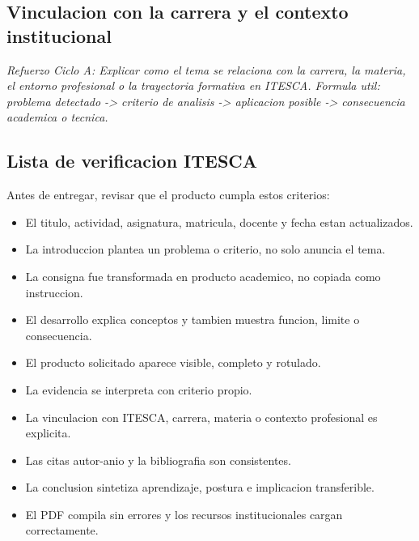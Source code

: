 \documentclass[
	spanish,
	letterpaper, oneside
]{article}
\begin{document}
\subsection{Vinculacion con la carrera y el contexto institucional}

\textit{Refuerzo Ciclo A: Explicar como el tema se relaciona con la carrera, la materia, el entorno profesional o la trayectoria formativa en ITESCA. Formula util: problema detectado -> criterio de analisis -> aplicacion posible -> consecuencia academica o tecnica.}

\subsection{Lista de verificacion ITESCA}

Antes de entregar, revisar que el producto cumpla estos criterios:

\begin{itemize}
	\item El titulo, actividad, asignatura, matricula, docente y fecha estan actualizados.
	\item La introduccion plantea un problema o criterio, no solo anuncia el tema.
	\item La consigna fue transformada en producto academico, no copiada como instruccion.
	\item El desarrollo explica conceptos y tambien muestra funcion, limite o consecuencia.
	\item El producto solicitado aparece visible, completo y rotulado.
	\item La evidencia se interpreta con criterio propio.
	\item La vinculacion con ITESCA, carrera, materia o contexto profesional es explicita.
	\item Las citas autor-anio y la bibliografia son consistentes.
	\item La conclusion sintetiza aprendizaje, postura e implicacion transferible.
	\item El PDF compila sin errores y los recursos institucionales cargan correctamente.
\end{itemize}


\end{document}
